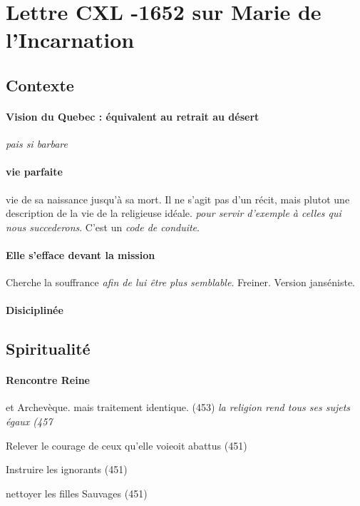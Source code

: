 \section{Lettre CXL -1652 sur Marie de l'Incarnation}

\subsection{Contexte}
\paragraph{Vision du Quebec : équivalent au retrait au désert} \textit{pais si barbare}

\paragraph{vie parfaite} vie de sa naissance jusqu'à sa mort. Il ne s'agit pas d'un récit, mais plutot une description de la vie de la religieuse idéale. \textit{pour servir d'exemple à celles qui nous succederons}. C'est un \textit{code de conduite}. 


\paragraph{Elle s'efface devant la mission} Cherche la souffrance \textit{afin de lui être plus semblable}. Freiner. Version janséniste.

\paragraph{Disiciplinée}

\subsection{Spiritualité}



\paragraph{Rencontre Reine} et Archevèque. mais traitement identique. (453) \textit{la religion rend tous ses sujets égaux (457}


Relever le courage de ceux qu'elle voieoit abattus (451)

Instruire les ignorants (451)

nettoyer les filles Sauvages (451)
